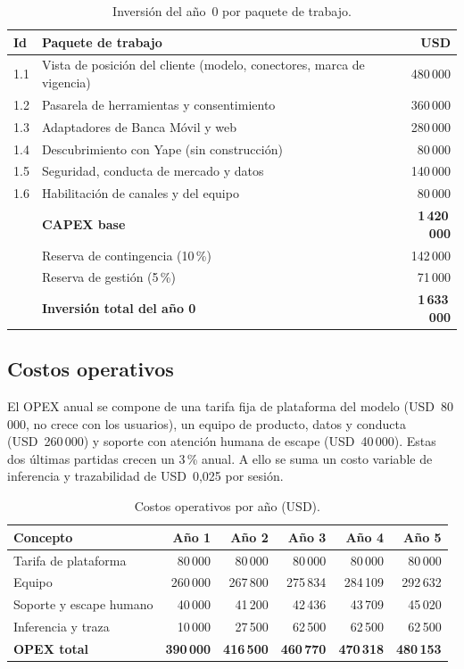 \documentclass[11pt,a4paper]{article}
\newcommand{\usd}[1]{USD~#1}
\begin{document}
\begin{table}[H]
\centering
\caption{Inversión del año~0 por paquete de trabajo.}
\small
\begin{tabularx}{\textwidth}{@{}l X r@{}}
\toprule
\textbf{Id} & \textbf{Paquete de trabajo} & \textbf{USD} \\
\midrule
1.1 & Vista de posición del cliente (modelo, conectores, marca de vigencia) & 480\,000 \\
1.2 & Pasarela de herramientas y consentimiento & 360\,000 \\
1.3 & Adaptadores de Banca Móvil y web & 280\,000 \\
1.4 & Descubrimiento con Yape (sin construcción) & 80\,000 \\
1.5 & Seguridad, conducta de mercado y datos & 140\,000 \\
1.6 & Habilitación de canales y del equipo & 80\,000 \\
\midrule
 & \textbf{CAPEX base} & \textbf{1\,420\,000} \\
 & Reserva de contingencia (10\,\%) & 142\,000 \\
 & Reserva de gestión (5\,\%) & 71\,000 \\
\midrule
 & \textbf{Inversión total del año 0} & \textbf{1\,633\,000} \\
\bottomrule
\end{tabularx}
\end{table}

\subsection{Costos operativos}

El OPEX anual se compone de una tarifa fija de plataforma del modelo (\usd{80\,000}, no crece con los usuarios), un equipo de producto, datos y conducta (\usd{260\,000}) y soporte con atención humana de escape (\usd{40\,000}). Estas dos últimas partidas crecen un 3\,\% anual. A ello se suma un costo variable de inferencia y trazabilidad de \usd{0,025} por sesión.

\begin{table}[H]
\centering
\caption{Costos operativos por año (USD).}
\small
\begin{tabularx}{\textwidth}{@{}X rrrrr@{}}
\toprule
\textbf{Concepto} & \textbf{Año 1} & \textbf{Año 2} & \textbf{Año 3} & \textbf{Año 4} & \textbf{Año 5} \\
\midrule
Tarifa de plataforma & 80\,000 & 80\,000 & 80\,000 & 80\,000 & 80\,000 \\
Equipo               & 260\,000 & 267\,800 & 275\,834 & 284\,109 & 292\,632 \\
Soporte y escape humano & 40\,000 & 41\,200 & 42\,436 & 43\,709 & 45\,020 \\
Inferencia y traza   & 10\,000 & 27\,500 & 62\,500 & 62\,500 & 62\,500 \\
\midrule
\textbf{OPEX total}  & \textbf{390\,000} & \textbf{416\,500} & \textbf{460\,770} & \textbf{470\,318} & \textbf{480\,153} \\
\bottomrule
\end{tabularx}
\end{table}
\end{document}
